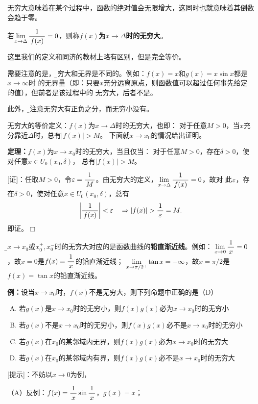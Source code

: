 无穷大意味着在某个过程中，函数的绝对值会无限增大，这同时也就意味着其倒数会趋于零。

\begin{thx}
	若$\lim\limits_{x\to{\Delta}}\displaystyle\frac{\,{1}\,}{\,{f(x)}\,}=0$，则称{\bf $f(x)$为$x\to\Delta$时的无穷大}。
\end{thx}

这里我们的定义和同济的教材上略有区别，但是完全等价。

需要注意的是，{\b 无穷大和无界是不同的}。例如：$f(x)=x$和$g(x)=x\sin x$都是$x\to\infty$时
的无界量（即：只要$x$充分远离原点，则函数值可以超过任何事先给定的值），但前者是该过程中的
无穷大，后者不是。

此外，{\b 要注意无穷大有正负之分，而无穷小没有。}

无穷大的等价定义：$f(x)$为$x\to\Delta$时的无穷大，也即：
对于任意$M>0$，当$x$充分靠近$\Delta$时，总有$|f(x)|>M$。
下面就$x\to x_0$的情况给出证明。

\begin{thx}
	{\bf 定理：}$f(x)$为$x\to x_0$时的无穷大，当且仅当：
	对于任意$M>0$，存在$\delta>0$，使对任意$x\in U_0(x_0,\delta)$，
	总有$|f(x)|>M$。
\end{thx}

[证]：任取$M>0$，令$\varepsilon=\displaystyle\frac{\,{1}\,}{\,{M}\,}$。由无穷大的定义，$\lim\limits_{x\to{\Delta}}\displaystyle\frac{\,{1}\,}{\,{f(x)}\,}=0$，故对
此$\varepsilon$，存在$\delta>0$，使对任意$x\in U_0(x_0,\delta)$，总有
$$\left|\df1{f(x)}\right|<\e\quad\Rightarrow |f(x)|>\df1{\e}=M.$$
即证。\hfill $\Box$

{\b$x\to x_0$或$x_0^+,x_0^-$时的无穷大对应的是函数曲线的{\bf 铅直渐近线}}。例如：
$\lim\limits_{x\to{0}}\displaystyle\frac{\,{1}\,}{\,{x}\,}=0$，故$x=0$是$f(x)=\displaystyle\frac{\,{1}\,}{\,{x}\,}$的铅直渐近线；
$\lim\limits_{x\to{\pi/2^+}}\tan x=-\infty$，故$x=\pi/2$是$f(x)=\tan x$的铅直渐近线。

{\bf 例：}设当$x\to x_0$时，$f(x)$不是无穷大，则下列命题中正确的是（D）
\begin{enumerate}[(A)]
  \setlength{\itemindent}{1cm}
  \item 若$g(x)$是$x\to x_0$时的无穷小，则$f(x)g(x)$必为$x\to x_0$时的无穷小
  \item 若$g(x)$不是$x\to x_0$时的无穷小，则$f(x)g(x)$必不是$x\to x_0$时的无穷小
  \item 若$g(x)$在$x_0$的某邻域内无界，则$f(x)g(x)$必为$x\to x_0$时的无穷大
  \item 若$g(x)$在$x_0$的某邻域内有界，则$f(x)g(x)$必不是$x\to x_0$时的无穷大
\end{enumerate}

[提示]：不妨以$x\to0$为例，

（A）反例：$f(x)=\displaystyle\frac{\,{1}\,}{\,{x}\,}\sin\displaystyle\frac{\,{1}\,}{\,{x}\,}$，$g(x)=x$；


